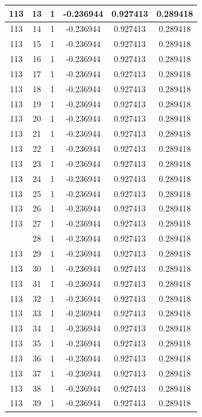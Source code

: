 \documentclass[12pt,a4paper]{article}
\numberwithin{equation}{section}
\numberwithin{figure}{section}
\numberwithin{table}{section}
\begin{document}
\begin{longtable}{|c|c|c|c|c|c|}
113 & 13 & 1 & -0.236944 & 0.927413 & 0.289418 \\ \hline
113 & 14 & 1 & -0.236944 & 0.927413 & 0.289418 \\ \hline
113 & 15 & 1 & -0.236944 & 0.927413 & 0.289418 \\ \hline
113 & 16 & 1 & -0.236944 & 0.927413 & 0.289418 \\ \hline
113 & 17 & 1 & -0.236944 & 0.927413 & 0.289418 \\ \hline
113 & 18 & 1 & -0.236944 & 0.927413 & 0.289418 \\ \hline
113 & 19 & 1 & -0.236944 & 0.927413 & 0.289418 \\ \hline
113 & 20 & 1 & -0.236944 & 0.927413 & 0.289418 \\ \hline
113 & 21 & 1 & -0.236944 & 0.927413 & 0.289418 \\ \hline
113 & 22 & 1 & -0.236944 & 0.927413 & 0.289418 \\ \hline
113 & 23 & 1 & -0.236944 & 0.927413 & 0.289418 \\ \hline
113 & 24 & 1 & -0.236944 & 0.927413 & 0.289418 \\ \hline
113 & 25 & 1 & -0.236944 & 0.927413 & 0.289418 \\ \hline
113 & 26 & 1 & -0.236944 & 0.927413 & 0.289418 \\ \hline
113 & 27 & 1 & -0.236944 & 0.927413 & 0.289418 \\ \hline
\pagebreak
113 & 28 & 1 & -0.236944 & 0.927413 & 0.289418 \\ \hline
113 & 29 & 1 & -0.236944 & 0.927413 & 0.289418 \\ \hline
113 & 30 & 1 & -0.236944 & 0.927413 & 0.289418 \\ \hline
113 & 31 & 1 & -0.236944 & 0.927413 & 0.289418 \\ \hline
113 & 32 & 1 & -0.236944 & 0.927413 & 0.289418 \\ \hline
113 & 33 & 1 & -0.236944 & 0.927413 & 0.289418 \\ \hline
113 & 34 & 1 & -0.236944 & 0.927413 & 0.289418 \\ \hline
113 & 35 & 1 & -0.236944 & 0.927413 & 0.289418 \\ \hline
113 & 36 & 1 & -0.236944 & 0.927413 & 0.289418 \\ \hline
113 & 37 & 1 & -0.236944 & 0.927413 & 0.289418 \\ \hline
113 & 38 & 1 & -0.236944 & 0.927413 & 0.289418 \\ \hline
113 & 39 & 1 & -0.236944 & 0.927413 & 0.289418 \\ \hline

\end{longtable}
\end{document}
